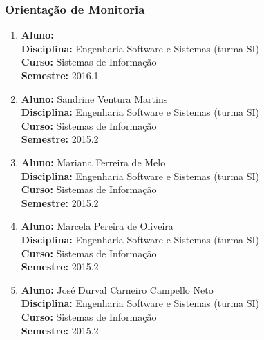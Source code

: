 
\subsubsection{Orienta\c{c}\~{a}o de Monitoria}
\vspace{0.3cm}

\begin{enumerate}
\renewcommand{\labelenumi}{{\large\bfseries\arabic{enumi}.}}

\item   \textbf{Aluno:}  \mbox{} \\
        \textbf{Disciplina:}  Engenharia Software e Sistemas (turma SI)\\
        \textbf{Curso:} Sistemas de Informação\\
        \textbf{Semestre:} 2016.1

\item   \textbf{Aluno:} Sandrine Ventura Martins \mbox{} \\
        \textbf{Disciplina:}  Engenharia Software e Sistemas (turma SI)\\
        \textbf{Curso:} Sistemas de Informação\\
        \textbf{Semestre:} 2015.2

\item   \textbf{Aluno:} Mariana Ferreira de Melo \mbox{} \\
        \textbf{Disciplina:}  Engenharia Software e Sistemas (turma SI)\\
        \textbf{Curso:} Sistemas de Informação\\
        \textbf{Semestre:} 2015.2

\item   \textbf{Aluno:} Marcela Pereira de Oliveira \mbox{} \\
        \textbf{Disciplina:}  Engenharia Software e Sistemas (turma SI)\\
        \textbf{Curso:} Sistemas de Informação\\
        \textbf{Semestre:} 2015.2

\item   \textbf{Aluno:} José Durval Carneiro Campello Neto \mbox{} \\
        \textbf{Disciplina:}  Engenharia Software e Sistemas (turma SI)\\
        \textbf{Curso:} Sistemas de Informação\\
        \textbf{Semestre:} 2015.2


\end{enumerate}
